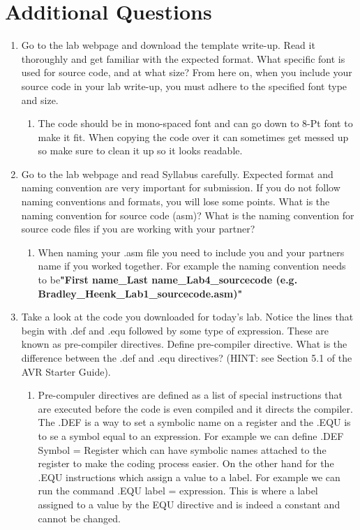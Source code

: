 \documentclass[12pt,letterpaper]{article}
\begin{document}
\section{Additional Questions}
\begin{enumerate}

    \item Go to the lab webpage and download the template write-up. Read it thoroughly and get familiar with the expected format. What specific font is used for source code, and at what size? From here on, when you include your source code in your lab write-up, you must adhere to the specified font type and size.
    
    \begin{enumerate}
    \item The code should be in mono-spaced font and can go down to 8-Pt font to make it fit. When copying the code over it can sometimes get messed up so make sure to clean it up so it looks readable.
    \end{enumerate}

	\item Go to the lab webpage and read Syllabus carefully. Expected format and
naming convention are very important for submission. If you do not follow naming conventions and formats, you will lose some points. What is the naming convention for source code (asm)? What is the naming convention for source code files if you are working with your partner?

	\begin{enumerate}
	\item When naming your .asm file you need to include you and your partners name if you worked together. For example the naming convention needs to be\textbf{"First name\_Last name\_Lab4\_sourcecode (e.g. Bradley\_Heenk\_Lab1\_sourcecode.asm)"}
	\end{enumerate}
	
	\item Take a look at the code you downloaded for today’s lab. Notice the lines that begin with .def and .equ followed by some type of expression. These are known as pre-compiler directives. Define pre-compiler directive. What is the difference between the .def and .equ directives? (HINT: see Section 5.1 of the AVR Starter Guide).
	
	\begin{enumerate}
	\item Pre-compuler directives are defined as a list of special instructions that are executed before the code is even compiled and it directs the compiler. The .DEF is a way to set a symbolic name on a register and the .EQU is to se a symbol equal to an expression. For example we can define .DEF Symbol = Register which can have symbolic names attached to the register to make the coding process easier. On the other hand for the .EQU instructions which assign a value to a label. For example we can run the command .EQU label = expression. This is where a label assigned to a value by the EQU directive and is indeed a constant and cannot be changed.
	\end{enumerate}
	

\end{enumerate}
\end{document}
